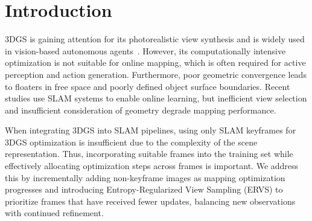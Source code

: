 \documentclass[nth=33]{humantech}
\begin{document}


\section{Introduction}
\label{sec:intro}
\ac{3DGS} is gaining attention for its photorealistic view synthesis and is widely used in vision-based autonomous agents~\cite{intro_zitkovich2023rt2}. However, its computationally intensive optimization is not suitable for online mapping, which is often required for active perception and action generation. Furthermore, poor geometric convergence leads to floaters in free space and poorly defined object surface boundaries. Recent studies use \ac{SLAM} systems to enable online learning, but inefficient view selection and insufficient consideration of geometry degrade mapping performance.

When integrating 3DGS into SLAM pipelines, using only SLAM keyframes for 3DGS optimization is insufficient due to the complexity of the scene representation. Thus, incorporating suitable frames into the training set while effectively allocating optimization steps across frames is important. We address this by incrementally adding non-keyframe images as mapping optimization progresses and introducing Entropy-Regularized View Sampling (ERVS) to prioritize frames that have received fewer updates, balancing new observations with continued refinement.
\end{document}
